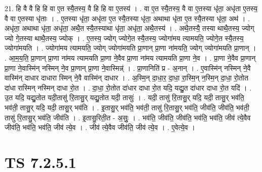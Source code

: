 \documentclass[17pt]{extarticle}
\begin{document}
21. हि वै वै हि हि वा ए॒त स्यै॒तस्य॒ वै हि हि वा ए॒तस्य॑ । . वा ए॒त स्यै॒तस्य॒ वै वा ए॒तस्या धृ॑ता॒ अधृ॑ता ए॒तस्य॒ वै वा ए॒तस्या धृ॑ताः । . ए॒तस्या धृ॑ता॒ अधृ॑ता ए॒त स्यै॒तस्या धृ॑ता॒ अथाथा धृ॑ता ए॒त स्यै॒तस्या धृ॑ता॒ अथ॑ । . अधृ॑ता॒ अथाथा धृ॑ता॒ अधृ॑ता॒ अथै॒त स्यै॒तस्याथा धृ॑ता॒ अधृ॑ता॒ अथै॒तस्य॑ । . अथै॒तस्यै॒ तस्या थाथै॒तस्य॒ ज्योग् ज्यो गे॒तस्या थाथै॒तस्य॒ ज्योक् । . ए॒तस्य॒ ज्योग् ज्योगे॒त स्यै॒तस्य॒ ज्योगा॑मय त्यामयति॒ ज्योगे॒त स्यै॒तस्य॒ ज्योगा॑मयति । . ज्योगा॑मय त्यामयति॒ ज्योग् ज्योगा॑मयति प्रा॒णान् प्रा॒णा ना॑मयति॒ ज्योग् ज्योगा॑मयति प्रा॒णान् । . आ॒म॒य॒ति॒ प्रा॒णान् प्रा॒णा ना॑मय त्यामयति प्रा॒णा ने॒वैव प्रा॒णा ना॑मय त्यामयति प्रा॒णा ने॒व । . प्रा॒णा ने॒वैव प्रा॒णान् प्रा॒णा ने॒वास्मि॑न् नस्मिन् ने॒व प्रा॒णान् प्रा॒णा ने॒वास्मिन्न्॑ । . प्रा॒णानिति॑ प्र - अ॒नान् । . ए॒वास्मि॑न् नस्मिन् ने॒वै वास्मि॑न् दाधार दाधारा स्मिन् ने॒वै वास्मि॑न् दाधार । . अ॒स्मि॒न् दा॒धा॒र॒ दा॒धा॒ रा॒स्मि॒न् न॒स्मि॒न् दा॒धा॒ रो॒तोत दा॑धा रास्मिन् नस्मिन् दाधा रो॒त । . दा॒धा॒ रो॒तोत दा॑धार दाधा रो॒त यदि॒ यद्यु॒त दा॑धार दाधा रो॒त यदि॑ । . उ॒त यदि॒ यद्यु॒तोत यदी॒तासु॑ रि॒तासु॒र् यद्यु॒तोत यदी॒ तासुः॑ । . यदी॒ तासु॑ रि॒तासु॒र् यदि॒ यदी॒ तासु॒र् भव॑ति॒ भव॑ती॒ तासु॒र् यदि॒ यदी॒ तासु॒र् भव॑ति । . इ॒तासु॒र् भव॑ति॒ भव॑ती॒ तासु॑ रि॒तासु॒र् भव॑ति॒ जीव॑ति॒ जीव॑ति॒ भव॑ती॒ तासु॑ रि॒तासु॒र् भव॑ति॒ जीव॑ति । . इ॒तासु॒रिती॒त - अ॒सुः॒ । . भव॑ति॒ जीव॑ति॒ जीव॑ति॒ भव॑ति॒ भव॑ति॒ जीव॑ त्ये॒वैव जीव॑ति॒ भव॑ति॒ भव॑ति॒ जीव॑ त्ये॒व । . जीव॑ त्ये॒वैव जीव॑ति॒ जीव॑ त्ये॒व । . ए॒वेत्ये॒व । \newline
\pagebreak
{}

\section{ TS 7.2.5.1 }
\end{document}
